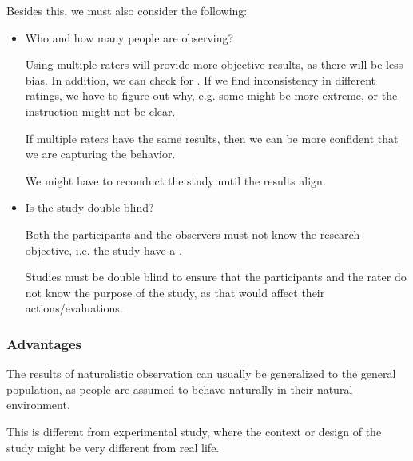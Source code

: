 \documentclass[../main/main.tex]{subfiles}
\begin{document}
Besides this, we must also consider the following:
\begin{itemize}
  \item Who and how many people are observing?
        \begin{remark}
Using multiple raters will provide more objective results, as there will be less bias. In addition, we can check for . If we find inconsistency in different ratings, we have to figure out why, e.g. some might be more extreme, or the instruction might not be clear.
        \end{remark}
        If multiple raters have the same results, then we can be more confident that we are capturing the behavior.
        \begin{remark}
We might have to reconduct the study until the results align.
        \end{remark}
  \item Is the study double blind?
        \begin{definition}
Both the participants and the observers must not know the research objective, i.e. the study have a .
        \end{definition}
        \begin{remark}
          Studies must be double blind to ensure that the participants and the rater do not know the purpose of the study, as that would affect their actions/evaluations.
        \end{remark}
\end{itemize}
\subsubsection{Advantages}
The results of naturalistic observation can usually be generalized to the general population, as people are assumed to behave naturally in their natural environment.
\begin{remark}
This is different from experimental study, where the context or design of the study might be very different from real life.
\end{remark}
\end{document}
